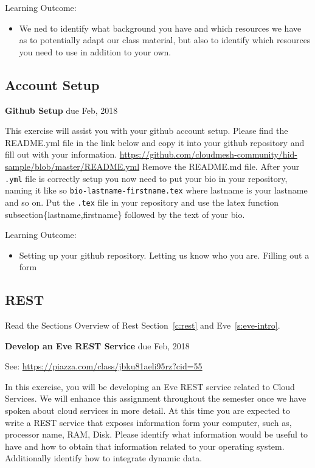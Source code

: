 Learning Outcome:
\begin{itemize}
\item We ned to identify what background you have and which resources
  we have as to potentially adapt our class material, but also to
  identify which resources you need to use in addition to your own.
\end{itemize}



\subsection{Account Setup}

\begin{exercise} {\bf Github Setup} due Feb, 2018

This exercise will assist you with your github account setup. Please
find the README.yml file in the link below and copy it into your
github repository and fill out with your
information. \url{https://github.com/cloudmesh-community/hid-sample/blob/master/README.yml}
Remove the README.md file. After your \verb|.yml| file is correctly setup you
now need to put your bio in your repository, naming it like so
\verb|bio-lastname-firstname.tex| where lastname is your lastname and so
on. Put the \verb|.tex| file in your repository and use the latex function
subsection\{lastname,firstname\} followed by the text of your bio.

\end{exercise}

Learning Outcome:
\begin{itemize}
\item Setting up your github repository. Letting us know who you
  are. Filling out a form
\end{itemize}



\subsection{REST}
\label{E:REST-a}
\begin{exercise}
Read the Sections Overview of Rest Section~\ref{c:rest} and Eve~\ref{s:eve-intro}.
\end{exercise}

\begin{exercise} {\bf Develop an Eve REST Service} due Feb, 2018

See: \url{https://piazza.com/class/jbku81aeli95rz?cid=55}

In this exercise, you will be developing an Eve REST service related
to Cloud Services. We will enhance this assignment throughout the
semester once we have spoken about cloud services in more detail. At
this time you are expected to write a REST service that exposes
information form your computer, such as, processor name, RAM,
Disk. Please identify what information would be useful to have and how
to obtain that information related to your operating
system. Additionally identify how to integrate dynamic data.


\end{exercise}

